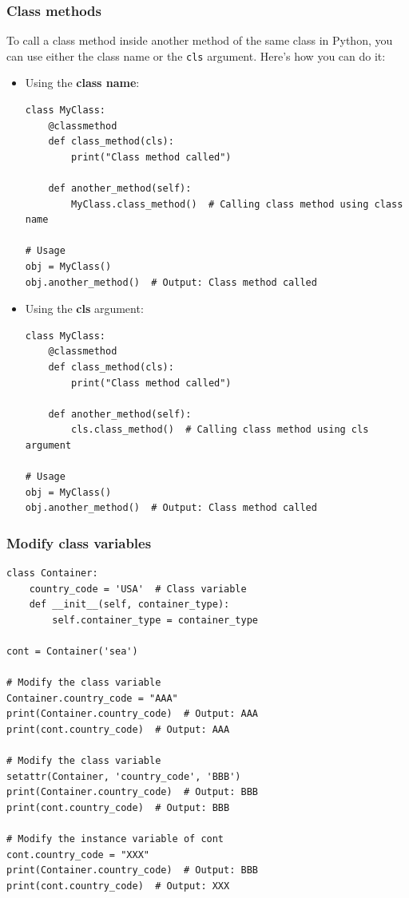 \subsubsection{Class methods}
To call a class method inside another method of the same class in Python, you can use either the class name or the \texttt{cls} argument. Here's how you can do it:
\begin{itemize}

\item Using the \textbf{class name}:
\begin{codebox}
\begin{verbatim}
class MyClass:
    @classmethod
    def class_method(cls):
        print("Class method called")

    def another_method(self):
        MyClass.class_method()  # Calling class method using class name

# Usage
obj = MyClass()
obj.another_method()  # Output: Class method called
\end{verbatim}
\end{codebox}

\item Using the \textbf{cls} argument:
\begin{codebox}
\begin{verbatim}
class MyClass:
    @classmethod
    def class_method(cls):
        print("Class method called")

    def another_method(self):
        cls.class_method()  # Calling class method using cls argument

# Usage
obj = MyClass()
obj.another_method()  # Output: Class method called
\end{verbatim}
\end{codebox}
\end{itemize}

\subsubsection{Modify class variables}
\begin{codebox}
\begin{verbatim}
class Container:
    country_code = 'USA'  # Class variable
    def __init__(self, container_type):
        self.container_type = container_type

cont = Container('sea')

# Modify the class variable
Container.country_code = "AAA"
print(Container.country_code)  # Output: AAA
print(cont.country_code)  # Output: AAA

# Modify the class variable
setattr(Container, 'country_code', 'BBB')
print(Container.country_code)  # Output: BBB
print(cont.country_code)  # Output: BBB

# Modify the instance variable of cont
cont.country_code = "XXX"
print(Container.country_code)  # Output: BBB
print(cont.country_code)  # Output: XXX
\end{verbatim}
\end{codebox} 

